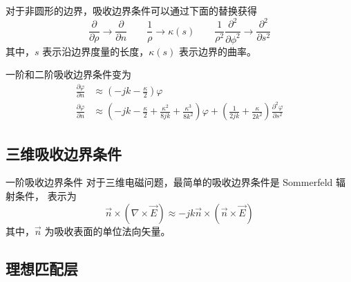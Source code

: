 \begin{theorem}
    对于非圆形的边界，吸收边界条件可以通过下面的替换获得
    \begin{equation}
        \frac{\partial}{\partial \rho}
        \rightarrow
        \frac{\partial}{\partial n}
        \qquad
        \frac{1}{\rho}
        \rightarrow
        \kappa(s)
        \qquad
        \frac{1}{\rho^2}
        \frac{\partial^2}{\partial \phi^2}  
        \rightarrow
        \frac{\partial^2}{\partial s^2}
    \end{equation}
    其中，$s$ 表示沿边界度量的长度，$\kappa(s)$ 表示边界的曲率。

    一阶和二阶吸收边界条件变为
    \begin{align}
        \frac{\partial \varphi}{\partial n}
        &\approx
        \left(
            -jk-\frac{\kappa}{2}
        \right)\varphi\\
        \frac{\partial \varphi}{\partial n}
        &\approx
        \left(
            -jk-\frac{\kappa}{2}
            +\frac{\kappa^2}{8jk}
            +\frac{\kappa^3}{8k^2}
        \right)\varphi
        +\left(
            \frac{1}{2jk}
            +\frac{\kappa}{2k^2}
        \right)\frac{\partial^2 \varphi}{\partial s^2}
    \end{align}
\end{theorem}

\subsection{三维吸收边界条件}

\begin{theorem}{一阶吸收边界条件}
    对于三维电磁问题，最简单的吸收边界条件是 Sommerfeld 辐射条件，
    表示为
    \begin{equation}
        \vec{n}\times(\nabla\times\vec{E})
        \approx
        -jk\vec{n}\times(\vec{n}\times\vec{E})
    \end{equation}
    其中，$\vec{n}$ 为吸收表面的单位法向矢量。
\end{theorem}

\subsection{理想匹配层}
